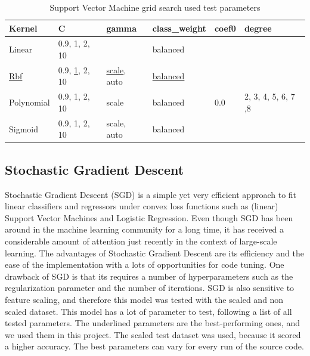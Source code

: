 \documentclass[11pt]{article}
\renewcommand{\arraystretch}{1.3}
\begin{document}
	\begin{table}[H]
		\renewcommand{\arraystretch}{1.3}
		\centering
		\begin{tabular}{llllll}
			Kernel & C  & gamma & class\_weight & coef0 & degree \\
			\toprule
			Linear & 0.9, 1, 2, 10  & & balanced & & \\
			\underline{Rbf} &  0.9, \underline{1}, 2, 10  & \underline{scale}, auto & \underline{balanced} & & \\
			Polynomial & 0.9, 1, 2, 10 & scale & balanced & 0.0 & 2, 3, 4, 5, 6, 7 ,8 \\
			Sigmoid & 0.9, 1, 2, 10  & scale, auto & balanced & & \\
		\end{tabular}
		\caption{Support Vector Machine grid search used test parameters}
		\label{tab:SVMSParameters}
	\end{table}

	\subsection{Stochastic Gradient Descent}
	Stochastic Gradient Descent (SGD) is a simple yet very efficient approach to fit linear classifiers and regressors under convex loss functions such as (linear) Support Vector Machines and Logistic Regression. Even though SGD has been around in the machine learning community for a long time, it has received a considerable amount of attention just recently in the context of large-scale learning.
	\medbreak
	The advantages of Stochastic Gradient Descent are its efficiency and the ease of the implementation with a lots of opportunities for code tuning. One drawback of SGD is that its requires a number of hyperparameters such as the regularization parameter and the number of iterations. SGD is also sensitive to feature scaling, and therefore this model was tested with the scaled and non scaled dataset. This model has a lot of parameter to test, following a list of all tested parameters. The underlined parameters are the best-performing ones, and we used them in this project. The scaled test dataset was used, because it scored a higher accuracy. The best parameters can vary for every run of the source code.
	
\end{document}
